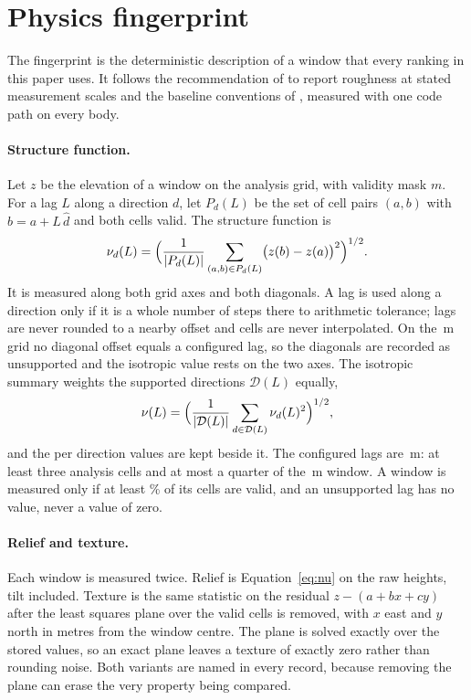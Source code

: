 \section{Physics fingerprint}
\label{sec:fingerprint}

The fingerprint is the deterministic description of a window that every ranking in this paper
uses. It follows the recommendation of \citet{shepard2001} to report roughness at stated measurement scales and the baseline conventions of \citet{rosenburg2011}, measured with one code path on every body.

\paragraph{Structure function.} Let $z$ be the elevation of a window on the analysis grid, with
validity mask $m$. For a lag $L$ along a direction $d$, let $P_d(L)$ be the set of cell pairs
$(a, b)$ with $b = a + L\,\hat d$ and both cells valid. The structure function is
\begin{equation}
  \nu_d(L) = \Bigl(\frac{1}{\lvert P_d(L)\rvert} \sum_{(a,b) \in P_d(L)}
  \bigl(z(b) - z(a)\bigr)^2\Bigr)^{1/2}.
  \label{eq:nu}
\end{equation}
It is measured along both grid axes and both diagonals. A lag is used along a direction only if
it is a whole number of steps there to arithmetic tolerance; lags are never rounded to a nearby
offset and cells are never interpolated. On the \ConfigGridM\,m grid no diagonal offset equals a
configured lag, so the diagonals are recorded as unsupported and the isotropic value rests on the
two axes. The isotropic summary weights the supported directions $\mathcal{D}(L)$ equally,
\begin{equation}
  \nu(L) = \Bigl(\frac{1}{\lvert \mathcal{D}(L)\rvert} \sum_{d \in \mathcal{D}(L)} \nu_d(L)^2\Bigr)^{1/2},
  \label{eq:isotropic}
\end{equation}
and the per direction values are kept beside it. The configured lags are \ConfigLags\,m: at least
three analysis cells and at most a quarter of the \ConfigWindowM\,m window. A window is measured
only if at least \ConfigMinValidPct\% of its cells are valid, and an unsupported lag has no value,
never a value of zero.

\paragraph{Relief and texture.} Each window is measured twice. Relief is
Equation~\eqref{eq:nu} on the raw heights, tilt included. Texture is the same statistic on the
residual $z - (a + b x + c y)$ after the least squares plane over the valid cells is removed, with
$x$ east and $y$ north in metres from the window centre. The plane is solved exactly over the
stored values, so an exact plane leaves a texture of exactly zero rather than rounding noise. Both
variants are named in every record, because removing the plane can erase the very property being
compared.

